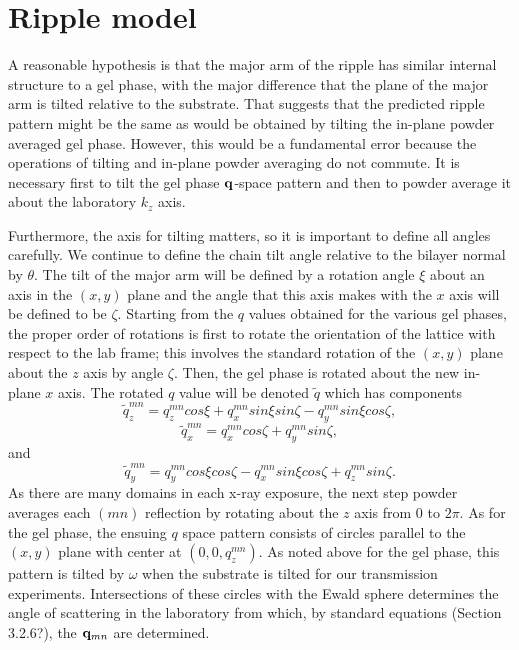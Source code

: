 \documentclass[
 preprint,
 showkeys, 
 amsmath,
 amssymb,
 aps,
]{revtex4-1}
\begin{document}
\section{Ripple model}
A reasonable hypothesis is that the major arm of the ripple has similar internal structure to a gel phase, with the major   difference that the plane of the major arm is tilted relative to the substrate.  That suggests that the predicted ripple pattern might be the same as would be obtained by tilting the in-plane powder averaged gel phase.  However, this would be a fundamental error because the operations of tilting and in-plane powder averaging do not commute.  It is necessary first to tilt the gel phase $\bold{q}$-space pattern and then to powder average it about the laboratory $k_z$ axis.  

Furthermore, the axis for tilting matters, so it is important to define all angles carefully.  We continue to define the chain tilt angle relative to the bilayer normal by $\theta$.  The tilt of the major arm will be defined by a rotation angle $\xi$ about an axis in the $(x,y)$ plane and the angle that this axis makes with the $x$ axis will be defined to be $\zeta$.  Starting from the $q$ values obtained for the various gel phases, the proper order of rotations is first to rotate the orientation of the lattice with respect to the lab frame; this involves the standard rotation of the $(x,y)$ plane about the $z$ axis by angle $\zeta$.  Then, the gel phase is rotated about the new in-plane $x$ axis. The rotated $q$ value will be denoted $\tilde{q}$ which has components
\begin{equation}\label{qtz}
\tilde{q}_{z}^{mn}=q_{z}^{mn}cos{\xi}+q_{x}^{mn}sin{\xi}sin{\zeta}-q_{y}^{mn}sin{\xi}cos{\zeta},
\end{equation}
\begin{equation}\label{qtx}
\tilde{q}_{x}^{mn}=q_{x}^{mn}cos{\zeta}+q_{y}^{mn}sin{\zeta},
\end{equation}
and
\begin{equation}\label{qty}
\tilde{q}_{y}^{mn}=q_{y}^{mn}cos{\xi}cos{\zeta}-q_{x}^{mn}sin{\xi}cos{\zeta}+q_{z}^{mn}sin{\zeta}.
\end{equation}
As there are many domains in each x-ray exposure, the next step powder averages each $(mn)$ reflection by rotating about the $z$ axis from $0$ to $2\pi$.  As for the gel phase, the ensuing $q$ space pattern consists of circles parallel to the $(x,y)$ plane with center at $(0,0,q_z^{mn})$.  As noted above for the gel phase, this pattern is tilted by $\omega$ when the substrate is tilted for our transmission experiments.  Intersections of these circles with the Ewald sphere determines the angle of scattering in the laboratory from which, by standard equations (Section 3.2.6?), the $\bold{q}_{mn}$ are determined.  
\end{document}
